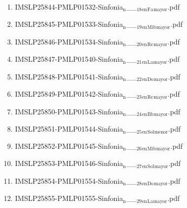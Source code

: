 \documentclass[11pt]{article}
\begin{document}
\begin{enumerate}
\begin{enumerate}
\item IMSLP25844-PMLP01532-Sinfonia$_{\text{n}}$\_\_$_{\text{18}}$$_{\text{en}}$$_{\text{Fa}}$$_{\text{mayor}}$.pdf
\label{sec-1-1-1-1-44-49-11-19}

\item IMSLP25845-PMLP01533-Sinfonia$_{\text{n}}$\_\_$_{\text{19}}$$_{\text{en}}$$_{\text{Mib}}$$_{\text{mayor}}$.pdf
\label{sec-1-1-1-1-44-49-11-20}

\item IMSLP25846-PMLP01534-Sinfonia$_{\text{n}}$\_\_$_{\text{20}}$$_{\text{en}}$$_{\text{Re}}$$_{\text{mayor}}$.pdf
\label{sec-1-1-1-1-44-49-11-21}

\item IMSLP25847-PMLP01540-Sinfonia$_{\text{n}}$\_\_$_{\text{21}}$$_{\text{en}}$$_{\text{La}}$$_{\text{mayor}}$.pdf
\label{sec-1-1-1-1-44-49-11-22}

\item IMSLP25848-PMLP01541-Sinfonia$_{\text{n}}$\_\_$_{\text{22}}$$_{\text{en}}$$_{\text{Do}}$$_{\text{mayor}}$.pdf
\label{sec-1-1-1-1-44-49-11-23}

\item IMSLP25849-PMLP01542-Sinfonia$_{\text{n}}$\_\_$_{\text{23}}$$_{\text{en}}$$_{\text{Re}}$$_{\text{mayor}}$.pdf
\label{sec-1-1-1-1-44-49-11-24}

\item IMSLP25850-PMLP01543-Sinfonia$_{\text{n}}$\_\_$_{\text{24}}$$_{\text{en}}$$_{\text{Bb}}$$_{\text{mayor}}$.pdf
\label{sec-1-1-1-1-44-49-11-25}

\item IMSLP25851-PMLP01544-Sinfonia$_{\text{n}}$\_\_$_{\text{25}}$$_{\text{en}}$$_{\text{Sol}}$$_{\text{menor}}$.pdf
\label{sec-1-1-1-1-44-49-11-26}

\item IMSLP25852-PMLP01545-Sinfonia$_{\text{n}}$\_\_$_{\text{26}}$$_{\text{en}}$$_{\text{Mib}}$$_{\text{mayor}}$.pdf
\label{sec-1-1-1-1-44-49-11-27}

\item IMSLP25853-PMLP01546-Sinfonia$_{\text{n}}$\_\_$_{\text{27}}$$_{\text{en}}$$_{\text{Sol}}$$_{\text{mayor}}$.pdf
\label{sec-1-1-1-1-44-49-11-28}

\item IMSLP25854-PMLP01554-Sinfonia$_{\text{n}}$\_\_$_{\text{28}}$$_{\text{en}}$$_{\text{Do}}$$_{\text{mayor}}$.pdf
\label{sec-1-1-1-1-44-49-11-29}

\item IMSLP25855-PMLP01555-Sinfonia$_{\text{n}}$\_\_$_{\text{29}}$$_{\text{en}}$$_{\text{La}}$$_{\text{mayor}}$.pdf
\label{sec-1-1-1-1-44-49-11-30}


\end{enumerate}
\end{enumerate}
\end{document}
